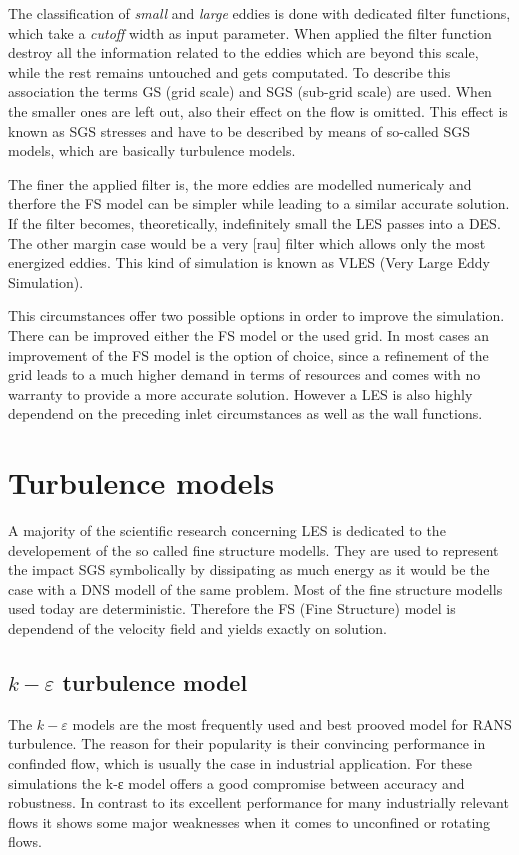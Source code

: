 The classification of \emph{small} and \emph{large} eddies is done with dedicated filter functions, which take a \emph{cutoff} width as input parameter. When applied the filter function destroy all the information related to the eddies which are beyond this scale, while the rest remains untouched and gets computated. To describe this association the terms GS (grid scale) and SGS (sub-grid scale) are used. When the smaller ones are left out, also their effect on the flow is omitted. This effect is known as SGS stresses and have to be described by means of so-called SGS models, which are basically turbulence models.

The finer the applied filter is, the more eddies are modelled numericaly and therfore the FS model can be simpler while leading to a similar accurate solution. If the filter becomes, theoretically, indefinitely small the LES passes into a DES. The other margin case would be a very [rau] filter which allows only the most energized eddies. This kind of simulation is known as VLES (Very Large Eddy Simulation).

This circumstances offer two possible options in order to improve the simulation. There can be improved either the FS model or the used grid. In most cases an improvement of the FS model is the option of choice, since a refinement of the grid leads to a much higher demand in terms of resources and comes with no warranty to provide a more accurate solution. However a LES is also highly dependend on the preceding inlet circumstances as well as the wall functions.

\section{Turbulence models}
A majority of the scientific research concerning LES is dedicated to the developement of the so called fine structure modells. They are used to represent the impact SGS symbolically by dissipating as much energy as it would be the case with a DNS modell of the same problem. Most of the fine structure modells used today are deterministic. Therefore the FS (Fine Structure) model is dependend of the velocity field and yields exactly on solution.
\subsection{$k-\varepsilon$ turbulence model}
The $k-\varepsilon$  models are the most frequently used and best prooved model for RANS turbulence. The reason for their popularity is their convincing performance in confinded flow, which is usually the case in industrial application. For these simulations the k-ε model offers a good compromise between accuracy and robustness. In contrast to its excellent performance for many industrially relevant flows it shows some major weaknesses when it comes to unconfined or rotating flows.

